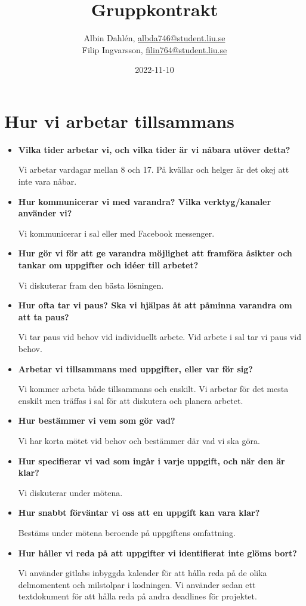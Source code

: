 \documentclass{mall}
\author{Albin Dahlén, \url{albda746@student.liu.se}\\
  Filip Ingvarsson, \url{filin764@student.liu.se}}
\title{Gruppkontrakt}
\date{2022-11-10}
\begin{document}
\projectpage

\section{Hur vi arbetar tillsammans}


\begin{itemize}
\item \textbf{Vilka tider arbetar vi, och vilka tider är vi nåbara utöver detta?}

  Vi arbetar vardagar mellan 8 och 17. På kvällar och helger är det okej att inte vara nåbar.

\item \textbf{Hur kommunicerar vi med varandra? Vilka verktyg/kanaler använder vi?}

  Vi kommunicerar i sal eller med Facebook messenger. 

\item \textbf{Hur gör vi för att ge varandra möjlighet att framföra åsikter och tankar om uppgifter och idéer till arbetet?}

  Vi diskuterar fram den bästa lösningen.

\item \textbf{Hur ofta tar vi paus? Ska vi hjälpas åt att påminna varandra om att ta paus?}

  Vi tar paus vid behov vid individuellt arbete. Vid arbete i sal tar vi paus vid behov.

\item \textbf{Arbetar vi tillsammans med uppgifter, eller var för sig?}

  Vi kommer arbeta både tillsammans och enskilt. Vi arbetar för det mesta enskilt men träffas i sal för att diskutera och planera arbetet.

\item \textbf{Hur bestämmer vi vem som gör vad?}

  Vi har korta mötet vid behov och bestämmer där vad vi ska göra.

\item \textbf{Hur specifierar vi vad som ingår i varje uppgift, och när den är klar?}

  Vi diskuterar under mötena.

\item \textbf{Hur snabbt förväntar vi oss att en uppgift kan vara klar?}

  Bestäms under mötena beroende på uppgiftens omfattning.

\item \textbf{Hur håller vi reda på att uppgifter vi identifierat inte glöms bort?}

  Vi använder gitlabs inbyggda kalender för att hålla reda på de olika delmomentent och milstolpar i
  kodningen. Vi använder sedan ett textdokument för att hålla reda på andra deadlines för projektet.

\end{itemize}
\end{document}
